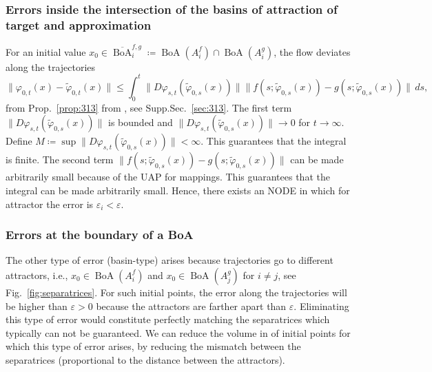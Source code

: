 \documentclass{article}
\newcommand{\boa}{\operatorname{BoA}}
\newcounter{ct}
\begin{document}
\subsubsection{Errors inside the intersection of the basins of attraction of target and approximation}\label{sec:inboa_approx}
For an initial value $x_0\in \overline{\boa}_i^{f,g} \coloneqq \boa(A_i^f) \cap \boa(A_i^g)$, the flow deviates along the trajectories 
\[
\|\varphi_{0,t}(x) - \tilde{\varphi}_{0,t}(x)\| \leq \int_0^t \|D\varphi_{s,t}(\tilde{\varphi}_{0,s}(x))\| \|f(s; \tilde{\varphi}_{0,s}(x)) - g(s; \tilde{\varphi}_{0,s}(x))\| \, ds,
\]
from Prop.~\ref{prop:313} from  \citep{vanhandel2007filtering}, see Supp.Sec.~\ref{sec:313}.
%
%
The first term \(\|D\varphi_{s,t}(\tilde{\varphi}_{0,s}(x))\|\) is bounded %
and \(\|D\varphi_{s,t}(\tilde{\varphi}_{0,s}(x))\|\rightarrow 0\) for \(t\rightarrow\infty\).
Define $M\coloneqq \sup \|D\varphi_{s,t}(\tilde{\varphi}_{0,s}(x))\|<\infty$. 
%
This guarantees that the integral is finite.
%
The second term $\|f(s; \tilde{\varphi}_{0,s}(x)) - g(s; \tilde{\varphi}_{0,s}(x))\|$
can be made arbitrarily small because of the UAP for mappings.
%
This guarantees that the integral can be made arbitrarily small.	
Hence, there exists an NODE in which for attractor the error is $\varepsilon_i<\varepsilon$. 






\subsubsection{Errors at the boundary of a BoA}\label{sec:boa_errors}%
\label{sec:separatrix_approx}
The other type of error (basin-type) arises because trajectories go to different attractors, i.e., $x_0\in \boa(A_i^f)$ and $x_0\in \boa(A_j^g)$ for $i\neq j$, see Fig.~\ref{fig:separatrices}.
For such initial points, the error along the trajectories will be higher than $\varepsilon>0$ because the attractors are farther apart than $\varepsilon$.
Eliminating this type of error would constitute perfectly matching the separatrices which typically can not be guaranteed.
We can reduce the volume in of initial points for which this type of error arises, by reducing the mismatch between the separatrices (proportional to the distance between the attractors).
\end{document}
